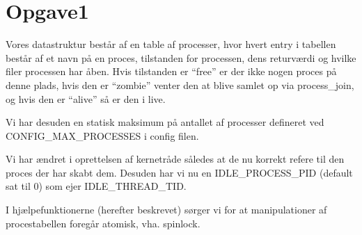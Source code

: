 \section{Opgave1}
Vores datastruktur består af en table af processer, hvor hvert entry i tabellen
består af et navn på en proces, tilstanden for processen, dens returværdi
og hvilke filer processen har åben.
Hvis tilstanden er ``free'' er der ikke nogen proces på denne plads,
hvis den er ``zombie'' venter den at blive samlet op via process\_join, og hvis
den er ``alive'' så er den i live.

Vi har desuden en statisk maksimum på antallet af processer defineret ved\\ 
CONFIG\_MAX\_PROCESSES i config filen.

Vi har ændret i oprettelsen af kernetråde således at de nu korrekt refere til
den proces der har skabt dem. Desuden har vi nu en IDLE\_PROCESS\_PID
(default sat til 0) som ejer IDLE\_THREAD\_TID.

I hjælpefunktionerne (herefter beskrevet) sørger vi for at manipulationer
af procestabellen foregår atomisk, vha. spinlock.
